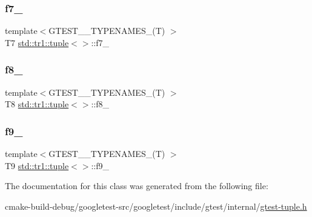 \mbox{\label{classstd_1_1tr1_1_1tuple_a7c28780e616d382833e844f62672c6bc}} 
\subsubsection{\texorpdfstring{f7\_}{f7\_}}
{\footnotesize\ttfamily template$<$G\+T\+E\+S\+T\+\_\+\_\+\+T\+Y\+P\+E\+N\+A\+M\+E\+S\+\_\+(\+T) $>$ \\
T7 \mbox{\hyperlink{classstd_1_1tr1_1_1tuple}{std\+::tr1\+::tuple}}$<$$>$\+::f7\+\_\+}

\mbox{\label{classstd_1_1tr1_1_1tuple_ae859012c83943e54e035a4a32089ccb6}} 
\subsubsection{\texorpdfstring{f8\_}{f8\_}}
{\footnotesize\ttfamily template$<$G\+T\+E\+S\+T\+\_\+\_\+\+T\+Y\+P\+E\+N\+A\+M\+E\+S\+\_\+(\+T) $>$ \\
T8 \mbox{\hyperlink{classstd_1_1tr1_1_1tuple}{std\+::tr1\+::tuple}}$<$$>$\+::f8\+\_\+}

\mbox{\label{classstd_1_1tr1_1_1tuple_a336d5e582fd34e45ec88c78d473671dd}} 
\subsubsection{\texorpdfstring{f9\_}{f9\_}}
{\footnotesize\ttfamily template$<$G\+T\+E\+S\+T\+\_\+\_\+\+T\+Y\+P\+E\+N\+A\+M\+E\+S\+\_\+(\+T) $>$ \\
T9 \mbox{\hyperlink{classstd_1_1tr1_1_1tuple}{std\+::tr1\+::tuple}}$<$$>$\+::f9\+\_\+}



The documentation for this class was generated from the following file\+:\begin{DoxyCompactItemize}
\item 
cmake-\/build-\/debug/googletest-\/src/googletest/include/gtest/internal/\mbox{\hyperlink{gtest-tuple_8h}{gtest-\/tuple.\+h}}\end{DoxyCompactItemize}
